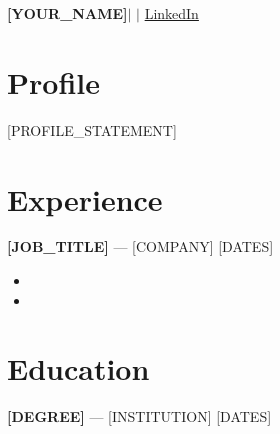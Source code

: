 \documentclass[11pt,a4paper]{article}
\begin{document}
\begin{center}
{\Huge \textbf{[YOUR_NAME]}} \quad $|$  \quad $|$ \quad \href{[YOUR_LINKEDIN_URL]}{LinkedIn}
\end{center}

\vspace{6pt}

\section*{Profile}
[PROFILE_STATEMENT]

\section*{Experience}
\textbf{[JOB_TITLE]} — [COMPANY] \hfill [DATES]
\begin{itemize}[leftmargin=*,itemsep=2pt]
  \item [BULLET_ONE]
  \item [BULLET_TWO]
\end{itemize}

\section*{Education}
\textbf{[DEGREE]} — [INSTITUTION] \hfill [DATES]
\end{document}
